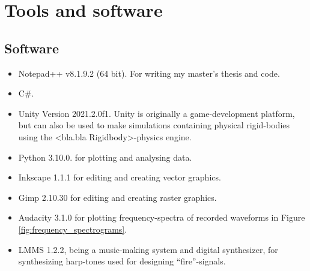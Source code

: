\chapter{Tools and software}
\label{chap:tools_and_software}








\section{Software}

\begin{itemize}
	\item Notepad++ v8.1.9.2 (64 bit). For writing my master's thesis and code.
	
	\item C\#.
	
	\item Unity Version 2021.2.0f1. Unity is originally a game-development platform, but can also be used to make  simulations containing physical rigid-bodies using the <bla.bla Rigidbody>-physics engine.
	
	\item Python 3.10.0. for plotting and analysing data.
	
	\item Inkscape 1.1.1 for editing and creating vector graphics.
	
	\item Gimp 2.10.30 for editing and creating raster graphics.
	
	\item Audacity 3.1.0 for plotting frequency-spectra of recorded waveforms in Figure \ref{fig:frequency_spectrograms}.
	
	\item LMMS 1.2.2, being a music-making system and digital synthesizer, for synthesizing harp-tones used for designing ``fire''-signals.
\end{itemize}

